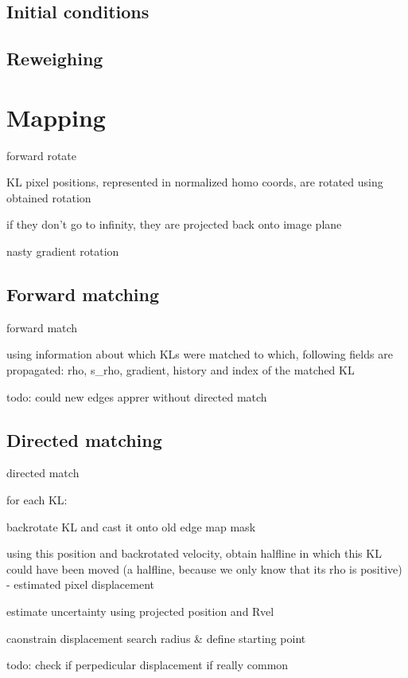 \subsection{Initial conditions}

\subsection{Reweighing}


\section{Mapping}

forward rotate

KL pixel positions, represented in normalized homo coords, are rotated using obtained rotation

if they don't go to infinity, they are projected back onto image plane

nasty gradient rotation

\subsection{Forward matching}

forward match

using information about which KLs were matched to which, following fields are propagated: rho, s\_rho, gradient, history and index of the matched KL

todo: could new edges apprer without directed match

\subsection{Directed matching}

directed match

 for each KL:

   backrotate KL and cast it onto old edge map mask

   using this position and backrotated velocity, obtain halfline in which this KL could have been moved (a halfline, because we only know that its rho is positive) - estimated pixel displacement

   estimate uncertainty using projected position and Rvel

   caonstrain displacement search radius \& define starting point

 todo: check if perpedicular displacement if really common



